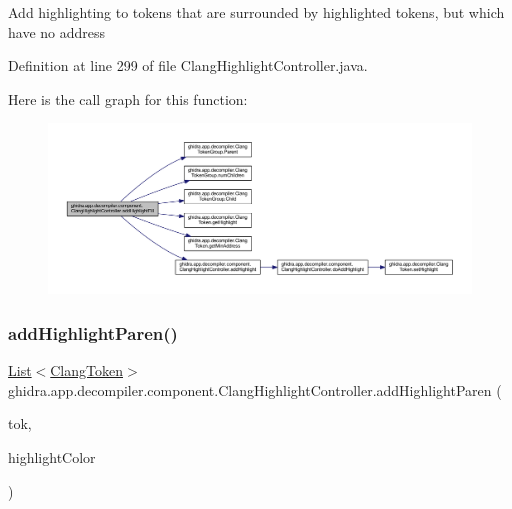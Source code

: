 Add highlighting to tokens that are surrounded by highlighted tokens, but which have no address 

Definition at line 299 of file Clang\+Highlight\+Controller.\+java.

Here is the call graph for this function\+:
\nopagebreak
\begin{figure}[H]
\begin{center}
\leavevmode
\includegraphics[width=350pt]{classghidra_1_1app_1_1decompiler_1_1component_1_1_clang_highlight_controller_a24a9a5eca47374398501c91a290d05d4_cgraph}
\end{center}
\end{figure}
\mbox{\label{classghidra_1_1app_1_1decompiler_1_1component_1_1_clang_highlight_controller_a6a321654fc1984f10228d9fba4527da1}} 
\subsubsection{\texorpdfstring{addHighlightParen()}{addHighlightParen()}}
{\footnotesize\ttfamily \mbox{\hyperlink{xml_8hh_ab5ab62f46b3735557c125f91b40ac155}{List}}$<$\mbox{\hyperlink{classghidra_1_1app_1_1decompiler_1_1_clang_token}{Clang\+Token}}$>$ ghidra.\+app.\+decompiler.\+component.\+Clang\+Highlight\+Controller.\+add\+Highlight\+Paren (\begin{DoxyParamCaption}\item[{\mbox{\hyperlink{classghidra_1_1app_1_1decompiler_1_1_clang_syntax_token}{Clang\+Syntax\+Token}}}]{tok,  }\item[{Color}]{highlight\+Color }\end{DoxyParamCaption})\hspace{0.3cm}{\ttfamily [inline]}}

